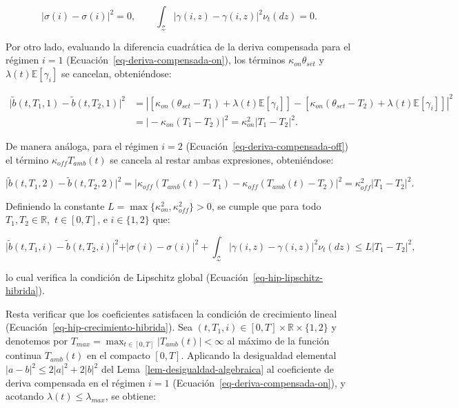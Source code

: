 \documentclass[
  spanish,
  us-letterpaper,
]{scrreprt}
\numberwithin{equation}{section}
\theoremstyle{plain}
\theoremstyle{plain}
\theoremstyle{plain}
\theoremstyle{definition}
\theoremstyle{remark}
\begin{document}
\[
\vert \sigma(i) - \sigma(i) \vert^2 = 0, \qquad \int_{\mathcal{Z}} \vert \gamma(i, z) - \gamma(i, z) \vert^2 \nu_t(dz) = 0.
\]

Por otro lado, evaluando la diferencia cuadrática de la deriva
compensada para el régimen \(i = 1\)
(Ecuación~\ref{eq-deriva-compensada-on}), los términos
\(\kappa_{on} \theta_{set}\) y \(\lambda(t)\mathbb{E}[\gamma_i]\) se
cancelan, obteniéndose:

\[
\begin{aligned}
\vert \tilde{b}(t, T_1, 1) - \tilde{b}(t, T_2, 1) \vert^2 &= \left\vert \left[ \kappa_{on}(\theta_{set} - T_1) + \lambda(t)\mathbb{E}[\gamma_i] \right] - \left[ \kappa_{on}(\theta_{set} - T_2) + \lambda(t)\mathbb{E}[\gamma_i] \right] \right\vert^2 \\
&= \vert -\kappa_{on}(T_1 - T_2) \vert^2 = \kappa_{on}^2 \vert T_1 - T_2 \vert^2.
\end{aligned}
\]

De manera análoga, para el régimen \(i = 2\)
(Ecuación~\ref{eq-deriva-compensada-off}) el término
\(\kappa_{off}T_{amb}(t)\) se cancela al restar ambas expresiones,
obteniéndose:

\[
\vert \tilde{b}(t, T_1, 2) - \tilde{b}(t, T_2, 2) \vert^2 = \left\vert \kappa_{off}(T_{amb}(t) - T_1) - \kappa_{off}(T_{amb}(t) - T_2) \right\vert^2 = \kappa_{off}^2 \vert T_1 - T_2 \vert^2.
\]

Definiendo la constante
\(L = \max\{\kappa_{on}^2, \kappa_{off}^2\} > 0\), se cumple que para
todo \(T_1, T_2 \in \mathbb{R},\) \(t \in [0, T]\), e \(i \in \{1, 2\}\)
que:

\[
\vert \tilde{b}(t, T_1, i) - \tilde{b}(t, T_2, i) \vert^2 + \vert \sigma(i) - \sigma(i) \vert^2 + \int_{\mathcal{Z}} \vert \gamma(i, z) - \gamma(i, z) \vert^2 \nu_t(dz) \le L \vert T_1 - T_2 \vert^2,
\]

lo cual verifica la condición de Lipschitz global
(Ecuación~\ref{eq-hip-lipschitz-hibrida}).

Resta verificar que los coeficientes satisfacen la condición de
crecimiento lineal (Ecuación~\ref{eq-hip-crecimiento-hibrida}). Sea
\((t, T_1, i) \in [0, T] \times \mathbb{R} \times \{1, 2\}\) y denotemos
por
\(\displaystyle T_{max} = \max_{t \in [0, T]} \vert T_{amb}(t) \vert < \infty\)
al máximo de la función continua \(T_{amb}(t)\) en el compacto
\([0, T]\). Aplicando la desigualdad elemental
\(\vert a - b \vert^2 \le 2\vert a \vert^2 + 2\vert b \vert^2\) del
Lema~\ref{lem-desigualdad-algebraica} al coeficiente de deriva
compensada en el régimen \(i = 1\)
(Ecuación~\ref{eq-deriva-compensada-on}), y acotando
\(\lambda(t) \le \lambda_{max}\), se obtiene:
\end{document}
